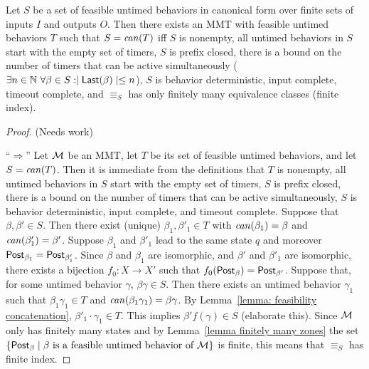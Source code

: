 \begin{theorem}
\label{Myhill Nerode}
Let $S$ be a set of feasible untimed behaviors in canonical form over finite sets of inputs $I$ and outputs $O$.
Then there exists an MMT with feasible untimed behaviors $T$ such that $S = \mathit{can}({T})$ iff 
$S$ is nonempty, all untimed behaviors in $S$
start with the empty set of timers, $S$ is prefix closed, 
there is a bound on the number of timers that can be active simultaneously 
($\exists n \in {\mathbb N} ~ \forall \beta \in S : \mid \mathsf{Last}({\beta}) \mid \leq n$),
$S$ is behavior deterministic, input complete, timeout complete,
and $\equiv_S$ has only finitely many equivalence classes (finite index).
\end{theorem}
\iflong
\begin{proof} (Needs work)

``$\Rightarrow$'' Let ${\mathcal M}$ be an MMT, let $T$ be its set of feasible untimed behaviors, and let $S = \mathit{can}({T})$.
Then it is immediate from the definitions that $T$ is nonempty, all untimed behaviors in $S$
start with the empty set of timers, 
$S$ is prefix closed, 
there is a bound on the number of timers that can be active simultaneously,
$S$ is behavior deterministic, input complete, and timeout complete.
Suppose that $\beta, \beta' \in S$.
Then there exist (unique) $\beta_1, \beta'_1 \in T$ with
$\mathit{can}({\beta_1})=\beta$ and $\mathit{can}({\beta'_1})=\beta'$.
Suppose $\beta_1$ and $\beta'_1$ lead to the same state $q$ and moreover $\mathsf{Post}_{\beta_1} = \mathsf{Post}_{\beta'_1}$.
Since $\beta$ and $\beta_1$ are isomorphic, and $\beta'$ and $\beta'_1$ are isomorphic,
there exists a bijection $f_0 : X \to X'$ such that $f_0(\mathsf{Post}_{\beta}) = \mathsf{Post}_{\beta'}$.
Suppose that, for some untimed behavior $\gamma$, $\beta \gamma \in S$.
Then there exists an untimed behavior $\gamma_1$ such that $\beta_1 \gamma_1 \in T$ and $\mathit{can}({\beta_1 \gamma_1}) = \beta \gamma$.
By Lemma~\ref{lemma: feasibility concatenation},
$\beta'_1 \cdot \gamma_1 \in T$.
This implies $\beta' f(\gamma) \in S$ (elaborate this).
Since ${\mathcal M}$ only has finitely many states and by Lemma~\ref{lemma finitely many zones} the set
$\{ \mathsf{Post}_{\beta} \mid \beta \mbox{ is a feasible untimed behavior of } {\mathcal M} \}$ is finite, this means that
$\equiv_S$ has finite index.


\end{proof}
